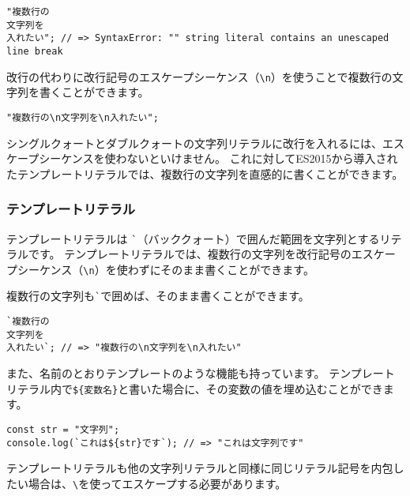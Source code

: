 \begin{lstlisting}
"複数行の
文字列を
入れたい"; // => SyntaxError: "" string literal contains an unescaped line break
\end{lstlisting}

改行の代わりに改行記号のエスケープシーケンス（\texttt{\textbackslash n}）を使うことで複数行の文字列を書くことができます。

\begin{lstlisting}
"複数行の\n文字列を\n入れたい";
\end{lstlisting}

シングルクォートとダブルクォートの文字列リテラルに改行を入れるには、エスケープシーケンスを使わないといけません。
これに対してES2015から導入されたテンプレートリテラルでは、複数行の文字列を直感的に書くことができます。

\hypertarget{template-literal}{%
\subsubsection{テンプレートリテラル\,\protect{}}\label{template-literal}}

テンプレートリテラルは
\lstinline{`}（バッククォート）で囲んだ範囲を文字列とするリテラルです。
テンプレートリテラルでは、複数行の文字列を改行記号のエスケープシーケンス（\texttt{\textbackslash n}）を使わずにそのまま書くことができます。

複数行の文字列も\lstinline{`}で囲めば、そのまま書くことができます。

\begin{lstlisting}
`複数行の
文字列を
入れたい`; // => "複数行の\n文字列を\n入れたい"
\end{lstlisting}

また、名前のとおりテンプレートのような機能も持っています。
テンプレートリテラル内で\texttt{\$\{変数名\}}と書いた場合に、その変数の値を埋め込むことができます。

\begin{lstlisting}
const str = "文字列";
console.log(`これは${str}です`); // => "これは文字列です"
\end{lstlisting}

テンプレートリテラルも他の文字列リテラルと同様に同じリテラル記号を内包したい場合は、\texttt{\textbackslash}を使ってエスケープする必要があります。

